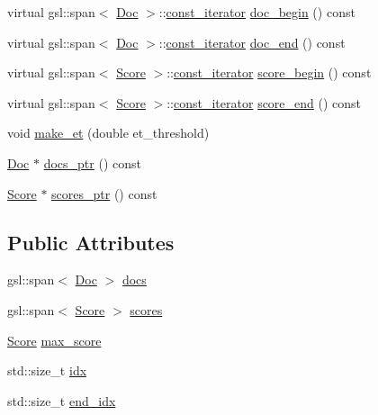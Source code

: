 \begin{DoxyCompactItemize}
virtual gsl\+::span$<$ \hyperlink{structbloodhound_1_1Doc}{Doc} $>$\+::\hyperlink{structbloodhound_1_1PostingList_1_1const__iterator}{const\+\_\+iterator} \hyperlink{classbloodhound_1_1PostingList_aac3dbe7fbf43ce93031e97b16bcfc888}{doc\+\_\+begin} () const
\item 
virtual gsl\+::span$<$ \hyperlink{structbloodhound_1_1Doc}{Doc} $>$\+::\hyperlink{structbloodhound_1_1PostingList_1_1const__iterator}{const\+\_\+iterator} \hyperlink{classbloodhound_1_1PostingList_aac468540b0a376d9b378a4333546245c}{doc\+\_\+end} () const
\item 
virtual gsl\+::span$<$ \hyperlink{structbloodhound_1_1Score}{Score} $>$\+::\hyperlink{structbloodhound_1_1PostingList_1_1const__iterator}{const\+\_\+iterator} \hyperlink{classbloodhound_1_1PostingList_aec5d5bb81622fb64d7b64416a8491456}{score\+\_\+begin} () const
\item 
virtual gsl\+::span$<$ \hyperlink{structbloodhound_1_1Score}{Score} $>$\+::\hyperlink{structbloodhound_1_1PostingList_1_1const__iterator}{const\+\_\+iterator} \hyperlink{classbloodhound_1_1PostingList_ae89abf9882f73f35a6e106c5a328ca6f}{score\+\_\+end} () const
\item 
void \hyperlink{classbloodhound_1_1PostingList_a3c9d6c5e88a7aae2642ff1d0f52160c0}{make\+\_\+et} (double et\+\_\+threshold)
\item 
\hyperlink{structbloodhound_1_1Doc}{Doc} $\ast$ \hyperlink{classbloodhound_1_1PostingList_acfca9e8ad1fd94461b56390fdd60779f}{docs\+\_\+ptr} () const
\item 
\hyperlink{structbloodhound_1_1Score}{Score} $\ast$ \hyperlink{classbloodhound_1_1PostingList_a79be9c874bb91e17ca308ae0528e9277}{scores\+\_\+ptr} () const
\end{DoxyCompactItemize}
\subsection*{Public Attributes}
\begin{DoxyCompactItemize}
\item 
gsl\+::span$<$ \hyperlink{structbloodhound_1_1Doc}{Doc} $>$ \hyperlink{classbloodhound_1_1PostingList_a11749c12634d86c73b7d9c150acaac03}{docs}
\item 
gsl\+::span$<$ \hyperlink{structbloodhound_1_1Score}{Score} $>$ \hyperlink{classbloodhound_1_1PostingList_a2c773bffa3d78d2e7a7e04d918b064da}{scores}
\item 
\hyperlink{structbloodhound_1_1Score}{Score} \hyperlink{classbloodhound_1_1PostingList_ab840a6f9ddf8de353cbdd09b3a184bfa}{max\+\_\+score}
\item 
std\+::size\+\_\+t \hyperlink{classbloodhound_1_1PostingList_a9aa9a9d1db46c6858fa952a36e1bf8fa}{idx}
\item 
std\+::size\+\_\+t \hyperlink{classbloodhound_1_1PostingList_a7c4d53dfa824951670d68ef57cd2068d}{end\+\_\+idx}
\end{DoxyCompactItemize}


